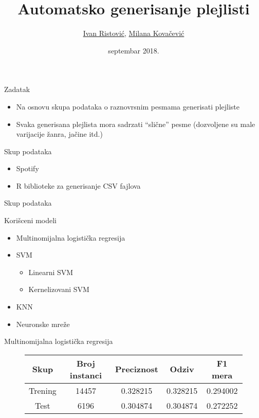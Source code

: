 \documentclass{beamer}
\title{Automatsko generisanje plejlisti}
\author{\href{mailto:mi14031@matf.bg.ac.rs}{Ivan Ristović}, \href{mailto:mi14042@matf.bg.ac.rs}{Milana Kovačević}
}
\date{septembar 2018.}
\begin{document}
\begin{frame}
    \titlepage
\end{frame}

\begin{frame}{Zadatak}
    \begin{itemize}
        \item Na osnovu skupa podataka o raznovrsnim pesmama generisati plejliste
        \item Svaka generisana plejlista mora sadrzati ``sli\v{c}ne'' pesme (dozvoljene su male varijacije \v{z}anra, ja\v{c}ine itd.)
    \end{itemize}
\end{frame}

\begin{frame}{Skup podataka}
    \begin{itemize}
        \item Spotify
        \item R biblioteke za generisanje CSV fajlova
    \end{itemize}
\end{frame}

\begin{frame}{Skup podataka}
\end{frame}

\begin{frame}{Kori\v{s}ceni modeli}
    \begin{itemize}
        \item Multinomijalna logisti\v{c}ka regresija
        \item SVM
        \begin{itemize}
            \item Linearni SVM
            \item Kernelizovani SVM
        \end{itemize}
        \item KNN
        \item Neuronske mre\v{z}e
    \end{itemize}
\end{frame}

\begin{frame}[fragile]{Multinomijalna logisti\v{c}ka regresija}
    \begin{figure}[!h]
    \centering
    \begin{tabular}{ | c | c | c | c | c |}
        \hline
        Skup & Broj instanci & Preciznost & Odziv & F1 mera \\
        \hline
        Trening & 14457 & 0.328215 & 0.328215 & 0.294002 \\
        Test & 6196 & 0.304874 & 0.304874 & 0.272252 \\
        \hline
    \end{tabular}
    \end{figure}
\end{frame}
\end{document}
